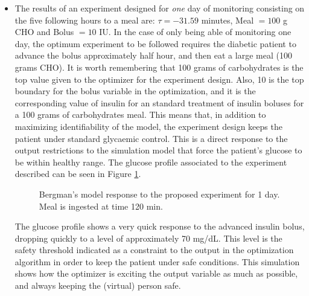 \begin{itemize}
\item{The results of an experiment designed for \textit{one} day of monitoring consisting on the five following hours to a meal are: $\tau = -31.59$ minutes, Meal $= 100$ g CHO and Bolus $=10$ IU. %
In the case of only being able of monitoring one day, the optimum experiment to be followed requires the diabetic patient to advance the bolus approximately half hour, and then eat a large meal (100 grams CHO). It is worth remembering that 100 grams of carbohydrates is the top value given to the optimizer for the experiment design. Also, 10 is the top boundary for the bolus variable in the optimization, and it is the corresponding value of insulin for an standard treatment of insulin boluses for a 100 grams of carbohydrates meal. This means that, in addition to maximizing identifiability of the model, the experiment design keeps the patient under standard glycaemic control. This is a direct response to the output restrictions to the simulation model that force the patient's glucose to be within healthy range. The glucose profile associated to the experiment described can be seen in Figure \ref{fig:bergmanexperiment1day}.

\begin{figure}[hbtp]
\centering
{}\caption{Bergman's model response to the proposed experiment for 1 day. Meal is ingested at time 120 min.}
\label{fig:bergmanexperiment1day}
\end{figure}

The glucose profile shows a very quick response to the advanced insulin bolus, dropping quickly to a level of approximately 70 mg/dL. This level is the safety threshold indicated as a constraint to the output in the optimization algorithm in order to keep the patient under safe conditions. This simulation shows how the optimizer is exciting the output variable as much as possible, and always keeping the (virtual) person safe.}


\end{itemize}
